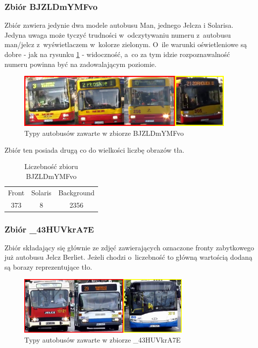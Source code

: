 \newpage

\subsubsection{Zbiór BJZLDmYMFvo}

Zbiór zawiera jedynie dwa modele autobusu Man, jednego
Jelcza i Solarisa. Jedyna uwaga może tyczyć trudności w~odczytywaniu
numeru z~autobusu man/jelcz z~wyświetlaczem w~kolorze zielonym. O~ile
warunki oświetleniowe są dobre - jak na rysunku \ref{fig:BJZLDmYMFvo_types}
- widoczność, a~co za tym idzie rozpoznawalność numeru powinna być na 
zadowalającym poziomie.

\begin{figure}[!h]
    \centering
    \includegraphics[width=0.95\textwidth]{img/exp_trainig_data_BJZ}
    \caption{Typy autobusów zawarte w zbiorze BJZLDmYMFvo}
    \label{fig:BJZLDmYMFvo_types}
\end{figure}

Zbiór ten posiada drugą co do wielkości 
liczbę obrazów tła. 

\begin{table}[!h]
    \centering
    \begin{tabular}{c|c|c}
        Front   & Solaris   & Background \\
        373     & 8         & 2356
    \end{tabular}
    \caption{Liczebność zbioru BJZLDmYMFvo}
    \label{tab:BJZLDmYMFvo_count}
\end{table}

\subsubsection{Zbiór \_43HUVkrA7E}

Zbiór składający się głównie ze zdjęć zawierających oznaczone fronty
zabytkowego już autobusu Jelcz Berliet. Jeżeli chodzi o~liczebność to 
główną wartością dodaną są borazy reprezentujące tło.

\begin{figure}[!h]
    \centering
    \includegraphics[width=0.75\textwidth]{img/exp_trainig_data__43}
    \caption{Typy autobusów zawarte w zbiorze \_43HUVkrA7E}
    \label{fig:_43HUVkrA7E_types}
\end{figure}

